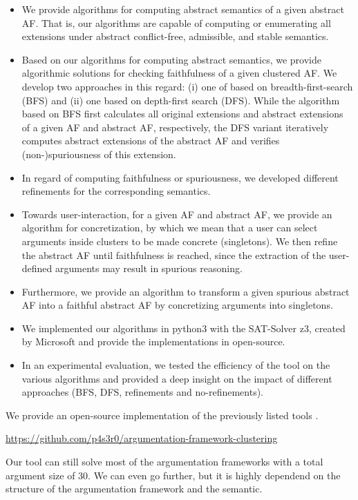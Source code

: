 \begin{itemize}
    \item We provide algorithms for computing abstract semantics of a given abstract AF. That is, our algorithms are capable of computing or enumerating all extensions under abstract conflict-free, admissible, and stable semantics.

    \item Based on our algorithms for computing abstract semantics, we provide algorithmic solutions for checking faithfulness of a given clustered AF. We develop two approaches in this regard: (i) one of based on breadth-first-search (BFS) and (ii) one based on depth-first search (DFS). While the algorithm based on BFS first calculates all original extensions and abstract extensions of a given AF and abstract AF, respectively, the DFS variant iteratively computes abstract extensions of the abstract AF and verifies (non-)spuriousness of this extension.
    
    \item In regard of computing faithfulness or spuriousness, we developed different refinements for the corresponding semantics.

    \item Towards user-interaction, for a given AF and abstract AF, we provide an algorithm for concretization, by which we mean that a user can select arguments inside clusters to be made concrete (singletons). We then refine the abstract AF until faithfulness is reached, since the extraction of the user-defined arguments may result in spurious reasoning.

    \item Furthermore, we provide an algorithm to transform a given spurious abstract AF into a faithful abstract AF by concretizing arguments into singletons.

    \item We implemented our algorithms in python3 with the SAT-Solver z3, created by Microsoft and provide the implementations in open-source.

    \item In an experimental evaluation, we tested the efficiency of the tool on the various algorithms and provided a deep insight on the impact of different approaches (BFS, DFS, refinements and no-refinements).
\end{itemize}

We provide an open-source implementation of the previously listed tools \cite{Pasero2024-AFClustering-Repo}.

\begin{center}
    \url{https://github.com/p4s3r0/argumentation-framework-clustering}
\end{center}


Our tool can still solve most of the argumentation frameworks with a total argument size of $30$. We can even go further, but it is highly dependend on the structure of the argumentation framework and the semantic.